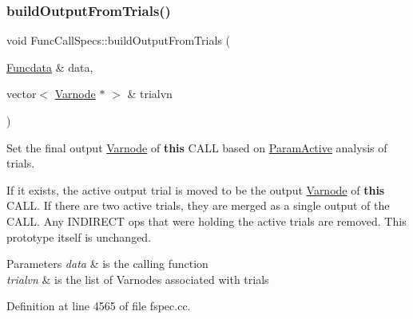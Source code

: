 \subsubsection{\texorpdfstring{buildOutputFromTrials()}{buildOutputFromTrials()}}
{\footnotesize\ttfamily void Func\+Call\+Specs\+::build\+Output\+From\+Trials (\begin{DoxyParamCaption}\item[{\mbox{\hyperlink{class_funcdata}{Funcdata}} \&}]{data,  }\item[{vector$<$ \mbox{\hyperlink{class_varnode}{Varnode}} $\ast$ $>$ \&}]{trialvn }\end{DoxyParamCaption})}



Set the final output \mbox{\hyperlink{class_varnode}{Varnode}} of {\bfseries{this}} C\+A\+LL based on \mbox{\hyperlink{class_param_active}{Param\+Active}} analysis of trials. 

If it exists, the active output trial is moved to be the output \mbox{\hyperlink{class_varnode}{Varnode}} of {\bfseries{this}} C\+A\+LL. If there are two active trials, they are merged as a single output of the C\+A\+LL. Any I\+N\+D\+I\+R\+E\+CT ops that were holding the active trials are removed. This prototype itself is unchanged. 
\begin{DoxyParams}{Parameters}
{\em data} & is the calling function \\
\hline
{\em trialvn} & is the list of Varnodes associated with trials \\
\hline
\end{DoxyParams}


Definition at line 4565 of file fspec.\+cc.

